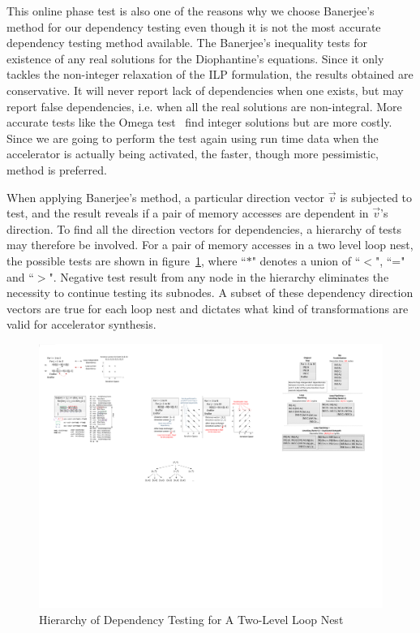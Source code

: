 This online phase test is also one of the reasons why we choose Banerjee's method for our dependency testing even though it is not the most accurate dependency testing method
available. The Banerjee's inequality tests for existence of any real solutions for the Diophantine's equations. Since it only tackles the non-integer relaxation of the ILP formulation, the results obtained are conservative.
It will never report lack of dependencies when one exists,  but may report false dependencies, i.e. when all the real solutions are non-integral.
 More accurate tests like the Omega test~\cite{omega} find integer solutions but are more costly. Since we are
going to perform the test again using run time data when the accelerator is actually
being activated, the faster, though more pessimistic, method is preferred.

When applying Banerjee's method, a particular direction vector $\vec{v}$ is subjected to test, and the result reveals if a pair of memory accesses are dependent in $\vec{v}$'s direction. 
To find all the direction vectors for dependencies, a hierarchy
of tests may therefore be involved. For a pair of memory accesses in a two level loop nest, the possible tests are shown in figure~\ref{fig:testingHier}, where ``$\ast$" denotes a union of ``$<$", ``=" and ``$>$". Negative test result from any node in the hierarchy eliminates the necessity to continue testing its subnodes. A subset of these dependency direction vectors
are true for each loop nest and dictates what kind of transformations are valid for accelerator synthesis.


\begin{figure}[htp]
\begin{center}
\includegraphics[width=0.6\linewidth]{chap6fig/testingHier.pdf}
\caption{Hierarchy of Dependency Testing for A Two-Level Loop Nest
\label{fig:testingHier}}
\end{center}
\end{figure}


